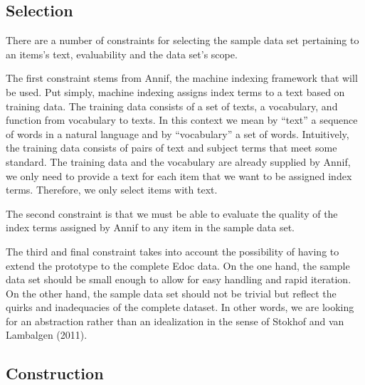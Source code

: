 \hypertarget{selection}{%
\subsection{Selection}\label{selection}}

There are a number of constraints for selecting the sample data set
pertaining to an items's text, evaluability and the data set's scope.

The first constraint stems from Annif, the machine indexing framework
that will be used. Put simply, machine indexing assigns index terms to a
text based on training data. The training data consists of a set of
texts, a vocabulary, and function from vocabulary to texts. In this
context we mean by ``text'' a sequence of words in a natural language
and by ``vocabulary'' a set of words. Intuitively, the training data
consists of pairs of text and subject terms that meet some standard. The
training data and the vocabulary are already supplied by Annif, we only
need to provide a text for each item that we want to be assigned index
terms. Therefore, we only select items with text.

The second constraint is that we must be able to evaluate the quality of
the index terms assigned by Annif to any item in the sample data set.

The third and final constraint takes into account the possibility of
having to extend the prototype to the complete Edoc data. On the one
hand, the sample data set should be small enough to allow for easy
handling and rapid iteration. On the other hand, the sample data set
should not be trivial but reflect the quirks and inadequacies of the
complete dataset. In other words, we are looking for an abstraction
rather than an idealization in the sense of Stokhof and van Lambalgen
(2011).

\hypertarget{construction}{%
\subsection{Construction}\label{construction}}

